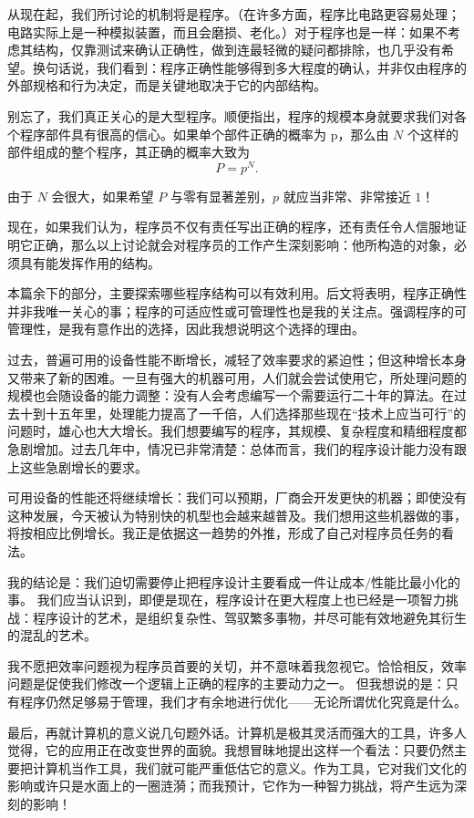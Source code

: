 从现在起，我们所讨论的机制将是程序。（在许多方面，程序比电路更容易处理；电路实际上是一种模拟装置，而且会磨损、老化。）对于程序也是一样：如果不考虑其结构，仅靠测试来确认正确性，做到连最轻微的疑问都排除，也几乎没有希望。换句话说，我们看到：程序正确性能够得到多大程度的确认，并非仅由程序的外部规格和行为决定，而是关键地取决于它的内部结构。

别忘了，我们真正关心的是大型程序。顺便指出，程序的规模本身就要求我们对各个程序部件具有很高的信心。如果单个部件正确的概率为 p，那么由 $N$ 个这样的部件组成的整个程序，其正确的概率大致为
$$
P=p^N.
$$

由于 $N$ 会很大，如果希望 $P$ 与零有显著差别，$p$ 就应当非常、非常接近 $1$！

现在，如果我们认为，程序员不仅有责任写出正确的程序，还有责任令人信服地证明它正确，那么以上讨论就会对程序员的工作产生深刻影响：他所构造的对象，必须具有能发挥作用的结构。

本篇余下的部分，主要探索哪些程序结构可以有效利用。后文将表明，程序正确性并非我唯一关心的事；程序的可适应性或可管理性也是我的关注点。强调程序的可管理性，是我有意作出的选择，因此我想说明这个选择的理由。

过去，普遍可用的设备性能不断增长，减轻了效率要求的紧迫性；但这种增长本身又带来了新的困难。一旦有强大的机器可用，人们就会尝试使用它，所处理问题的规模也会随设备的能力调整：没有人会考虑编写一个需要运行二十年的算法。在过去十到十五年里，处理能力提高了一千倍，人们选择那些现在“技术上应当可行”的问题时，雄心也大大增长。我们想要编写的程序，其规模、复杂程度和精细程度都急剧增加。过去几年中，情况已非常清楚：总体而言，我们的程序设计能力没有跟上这些急剧增长的要求。

可用设备的性能还将继续增长：我们可以预期，厂商会开发更快的机器；即使没有这种发展，今天被认为特别快的机型也会越来越普及。我们想用这些机器做的事，将按相应比例增长。我正是依据这一趋势的外推，形成了自己对程序员任务的看法。

我的结论是：我们迫切需要停止把程序设计主要看成一件让成本$/$性能比最小化的事。
我们应当认识到，即便是现在，程序设计在更大程度上也已经是一项智力挑战：程序设计的艺术，是组织复杂性、驾驭繁多事物，并尽可能有效地避免其衍生的混乱的艺术。

我不愿把效率问题视为程序员首要的关切，并不意味着我忽视它。恰恰相反，效率问题是促使我们修改一个逻辑上正确的程序的主要动力之一。
但我想说的是：只有程序仍然足够易于管理，我们才有余地进行优化——无论所谓优化究竟是什么。

最后，再就计算机的意义说几句题外话。计算机是极其灵活而强大的工具，许多人觉得，它的应用正在改变世界的面貌。我想冒昧地提出这样一个看法：只要仍然主要把计算机当作工具，我们就可能严重低估它的意义。作为工具，它对我们文化的影响或许只是水面上的一圈涟漪；而我预计，它作为一种智力挑战，将产生远为深刻的影响！
\smallskip

